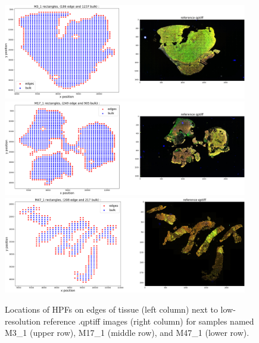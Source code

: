 \documentclass[letterpaper,11pt]{article}
\begin{document}
\begin{figure}[!ht]
\centering
\includegraphics[width=0.95\textwidth]{images/masking/rectangle_locations_M3_1}
\includegraphics[width=0.95\textwidth]{images/masking/rectangle_locations_M17_1}
\includegraphics[width=0.95\textwidth]{images/masking/rectangle_locations_M47_1}
\caption{\footnotesize Locations of HPFs on edges of tissue (left column) next to low-resolution reference .qptiff images (right column) for samples named M3\_1 (upper row), M17\_1 (middle row), and M47\_1 (lower row). }
\label{fig:edge_HPFs}
\end{figure}
\end{document}
